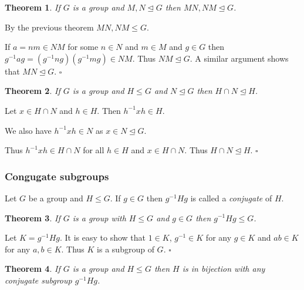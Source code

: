 \documentclass[10pt]{article}
\newtheorem{theorem}{Theorem}[section]
\newenvironment{proof}[1][Proof]{\begin{trivlist}
\item[\hskip \labelsep {\itshape #1}]}{\end{trivlist}}
\newenvironment{definition}[1][Definition]{\begin{trivlist}
\item[\hskip \labelsep {\bfseries #1}]}{\end{trivlist}}
\begin{document}
\begin{theorem}
If $G$ is a group and $M, N \mathrel{\unlhd} G$ then $MN, NM \mathrel{\unlhd} G$.
\end{theorem}

\begin{proof}
By the previous theorem $MN, NM \leq G$.

If $a = nm \in NM$ for some $n \in N$ and $m \in M$ and $g \in G$ then $g^{-1}ag = (g^{-1}ng)(g^{-1}mg) \in NM$. Thus $NM \mathrel{\unlhd} G$. A similar argument shows that $MN \mathrel{\unlhd} G$. $\square$
\end{proof}

\begin{theorem}
If $G$ is a group and $H \leq G$ and $N \mathrel{\unlhd} G$ then $H\cap N \mathrel{\unlhd} H$.
\end{theorem}

\begin{proof}
Let $x \in H\cap N$ and $h \in H$. Then $h^{-1}xh \in H$.

We also have $h^{-1}xh \in N$ as $x \in N \mathrel{\unlhd} G$.

Thus $h^{-1}xh \in H\cap N$ for all $h \in H$ and $x \in H\cap N$. Thus $H\cap N \mathrel{\unlhd} H$. $\square$
\end{proof}

\subsubsection{Congugate subgroups}

\begin{definition}
Let $G$ be a group and $H \leq G$. If $g \in G$ then $g^{-1}Hg$ is called a \emph{conjugate} of $H$.
\end{definition}

\begin{theorem}
If $G$ is a group with $H \leq G$ and $g \in G$ then $g^{-1}Hg \leq G$.
\end{theorem}

\begin{proof}
Let $K = g^{-1}Hg$. It is easy to show that $1 \in K$, $g^{-1} \in K$ for any $g \in K$ and $ab \in K$ for any $a, b \in K$. Thus $K$ is a subgroup of $G$. $\square$
\end{proof}

\begin{theorem}
If $G$ is a group and $H \leq G$ then $H$ is in bijection with any conjugate subgroup $g^{-1}Hg$.
\end{theorem}
\end{document}
